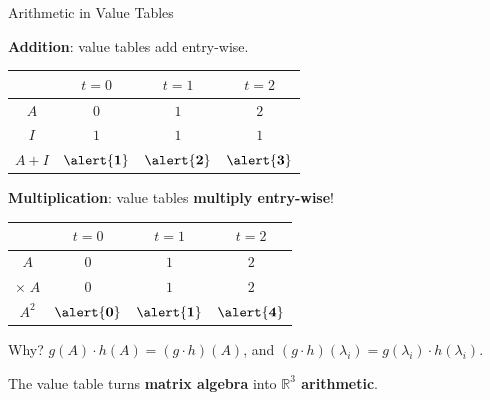 \documentclass[10pt]{beamer}
\theoremstyle{definition}
\newcommand{\x}[1]{\alert{\textbf{#1}}}
\begin{document}
%
%
\begin{frame}[shrink=3]{Arithmetic in Value Tables}

\x{Addition}: value tables add entry-wise.

\begin{center}
\renewcommand{\arraystretch}{1.3}
\begin{tabular}{c|ccc}
 & $t = 0$ & $t = 1$ & $t = 2$ \\
\hline
$A$ & $0$ & $1$ & $2$ \\
$I$ & $1$ & $1$ & $1$ \\
\hline
$A + I$ & $\x{1}$ & $\x{2}$ & $\x{3}$
\end{tabular}
\end{center}

\vfill\pause

\x{Multiplication}: value tables \x{multiply entry-wise}!

\begin{center}
\renewcommand{\arraystretch}{1.3}
\begin{tabular}{c|ccc}
 & $t = 0$ & $t = 1$ & $t = 2$ \\
\hline
$A$ & $0$ & $1$ & $2$ \\
$\times\; A$ & $0$ & $1$ & $2$ \\
\hline
$A^2$ & $\x{0}$ & $\x{1}$ & $\x{4}$
\end{tabular}
\end{center}

\vfill\pause

Why? \; $g(A) \cdot h(A) = (g \cdot h)(A)$, and $(g \cdot h)(\lambda_i) = g(\lambda_i) \cdot h(\lambda_i)$.

\vfill

The value table turns \x{matrix algebra} into \x{$\mathbb{R}^3$ arithmetic}.

\end{frame}
\end{document}
